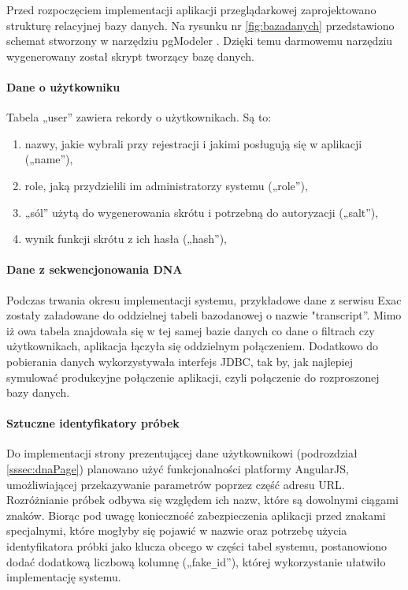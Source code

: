 \documentclass[a4paper,12pt,twoside]{article}
\begin{document}
\restoregeometry
\newpage

Przed rozpoczęciem implementacji aplikacji przeglądarkowej zaprojektowano strukturę
relacyjnej bazy danych. Na rysunku nr \ref{fig:bazadanych} przedstawiono schemat stworzony
w narzędziu pgModeler \cite{pgModeler}. Dzięki temu darmowemu narzędziu wygenerowany został
skrypt tworzący bazę danych.
\paragraph{Dane o użytkowniku} Tabela „user” zawiera rekordy o użytkownikach.
Są to:
\begin{enumerate}[1)]
\item nazwy, jakie wybrali przy rejestracji i jakimi posługują się w aplikacji („name”),
\item role, jaką przydzielili im administratorzy systemu („role”),
\item „sól” użytą do wygenerowania skrótu i potrzebną do autoryzacji („salt”),
\item wynik funkcji skrótu z ich hasła („hash”),
\end{enumerate}

\paragraph{Dane z sekwencjonowania DNA} Podczas trwania okresu implementacji systemu,
przykładowe dane z serwisu Exac zostały załadowane do oddzielnej tabeli bazodanowej o nazwie "transcript”. Mimo iż owa tabela znajdowała się w tej samej bazie danych co
dane o filtrach czy użytkownikach, aplikacja łączyła się oddzielnym połączeniem.
Dodatkowo do pobierania danych wykorzystywała interfejs JDBC, tak by, jak najlepiej
symulować produkcyjne połączenie aplikacji, czyli połączenie do rozproszonej bazy danych.

\paragraph{Sztuczne identyfikatory próbek} Do implementacji strony
prezentującej dane użytkownikowi (podrozdział \ref{sssec:dnaPage}) planowano użyć
funkcjonalności platformy AngularJS, umożliwiającej przekazywanie parametrów
poprzez część adresu URL. Rozróżnianie próbek odbywa się względem ich nazw, które
są dowolnymi ciągami znaków. Biorąc pod uwagę konieczność zabezpieczenia aplikacji przed
znakami specjalnymi, które mogłyby się pojawić w nazwie oraz potrzebę
użycia identyfikatora próbki jako klucza obcego w części tabel systemu, postanowiono
dodać dodatkową liczbową kolumnę („fake\verb!_!id”), której wykorzystanie ułatwiło implementację systemu.
\end{document}
